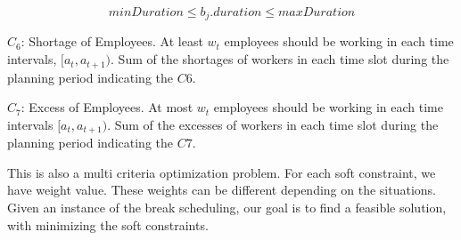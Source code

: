 \begin{equation}
minDuration \le b_j.duration \le maxDuration
\end{equation}

$C_6$: Shortage of Employees. At least $w_t$ employees should be working in each time intervals, $[a_t, a_{t+1})$. Sum of the shortages of workers in each time slot during the planning period indicating the $C6$.

$C_7$: Excess of Employees. At most $w_t$ employees should be working in each time intervals $[a_t, a_{t+1})$.  Sum of the excesses of workers in each time slot during the planning period indicating the $C7$.


This is also a multi criteria optimization problem. For each soft constraint, we have weight value. These weights can be different depending on the situations. Given an instance of the break scheduling, our goal is to find a feasible solution, with minimizing the soft constraints.